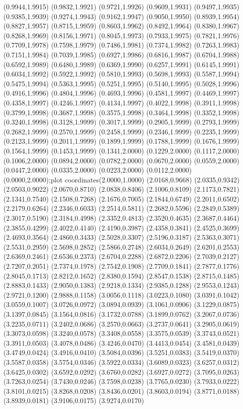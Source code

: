 {(0.9944,1.9915) (0.9832,1.9921) (0.9721,1.9926) (0.9609,1.9931) (0.9497,1.9935) (0.9385,1.9939) (0.9274,1.9943) (0.9162,1.9947) (0.9050,1.9950) (0.8939,1.9954) (0.8827,1.9957) (0.8715,1.9959) (0.8603,1.9962) (0.8492,1.9964) (0.8380,1.9967) (0.8268,1.9969) (0.8156,1.9971) (0.8045,1.9973) (0.7933,1.9975) (0.7821,1.9976) (0.7709,1.9978) (0.7598,1.9979) (0.7486,1.9981) (0.7374,1.9982) (0.7263,1.9983) (0.7151,1.9984) (0.7039,1.9985) (0.6927,1.9986) (0.6816,1.9987) (0.6704,1.9988) (0.6592,1.9989) (0.6480,1.9989) (0.6369,1.9990) (0.6257,1.9991) (0.6145,1.9991) (0.6034,1.9992) (0.5922,1.9992) (0.5810,1.9993) (0.5698,1.9993) (0.5587,1.9994) (0.5475,1.9994) (0.5363,1.9995) (0.5251,1.9995) (0.5140,1.9995) (0.5028,1.9996) (0.4916,1.9996) (0.4804,1.9996) (0.4693,1.9996) (0.4581,1.9997) (0.4469,1.9997) (0.4358,1.9997) (0.4246,1.9997) (0.4134,1.9997) (0.4022,1.9998) (0.3911,1.9998) (0.3799,1.9998) (0.3687,1.9998) (0.3575,1.9998) (0.3464,1.9998) (0.3352,1.9998) (0.3240,1.9998) (0.3128,1.9999) (0.3017,1.9999) (0.2905,1.9999) (0.2793,1.9999) (0.2682,1.9999) (0.2570,1.9999) (0.2458,1.9999) (0.2346,1.9999) (0.2235,1.9999) (0.2123,1.9999) (0.2011,1.9999) (0.1899,1.9999) (0.1788,1.9999) (0.1676,1.9999) (0.1564,1.9999) (0.1453,1.9999) (0.1341,2.0000) (0.1229,2.0000) (0.1117,2.0000) (0.1006,2.0000) (0.0894,2.0000) (0.0782,2.0000) (0.0670,2.0000) (0.0559,2.0000) (0.0447,2.0000) (0.0335,2.0000) (0.0223,2.0000) (0.0112,2.0000) (0.0000,2.0000)};plot coordinates{(2.0000,1.0000) (2.0168,0.9668) (2.0335,0.9342) (2.0503,0.9022) (2.0670,0.8710) (2.0838,0.8406) (2.1006,0.8109) (2.1173,0.7821) (2.1341,0.7540) (2.1508,0.7268) (2.1676,0.7005) (2.1844,0.6749) (2.2011,0.6502) (2.2179,0.6264) (2.2346,0.6033) (2.2514,0.5811) (2.2682,0.5596) (2.2849,0.5389) (2.3017,0.5190) (2.3184,0.4998) (2.3352,0.4813) (2.3520,0.4635) (2.3687,0.4464) (2.3855,0.4299) (2.4022,0.4140) (2.4190,0.3987) (2.4358,0.3841) (2.4525,0.3699) (2.4693,0.3564) (2.4860,0.3433) (2.5028,0.3307) (2.5196,0.3187) (2.5363,0.3071) (2.5531,0.2959) (2.5698,0.2852) (2.5866,0.2748) (2.6034,0.2649) (2.6201,0.2553) (2.6369,0.2461) (2.6536,0.2373) (2.6704,0.2288) (2.6872,0.2206) (2.7039,0.2127) (2.7207,0.2051) (2.7374,0.1978) (2.7542,0.1908) (2.7709,0.1841) (2.7877,0.1776) (2.8045,0.1713) (2.8212,0.1652) (2.8380,0.1594) (2.8547,0.1538) (2.8715,0.1485) (2.8883,0.1433) (2.9050,0.1383) (2.9218,0.1334) (2.9385,0.1288) (2.9553,0.1243) (2.9721,0.1200) (2.9888,0.1158) (3.0056,0.1118) (3.0223,0.1080) (3.0391,0.1042) (3.0559,0.1007) (3.0726,0.0972) (3.0894,0.0939) (3.1061,0.0906) (3.1229,0.0875) (3.1397,0.0845) (3.1564,0.0816) (3.1732,0.0788) (3.1899,0.0762) (3.2067,0.0736) (3.2235,0.0711) (3.2402,0.0686) (3.2570,0.0663) (3.2737,0.0641) (3.2905,0.0619) (3.3073,0.0598) (3.3240,0.0578) (3.3408,0.0558) (3.3575,0.0539) (3.3743,0.0521) (3.3911,0.0503) (3.4078,0.0486) (3.4246,0.0470) (3.4413,0.0454) (3.4581,0.0439) (3.4749,0.0424) (3.4916,0.0410) (3.5084,0.0396) (3.5251,0.0383) (3.5419,0.0370) (3.5587,0.0358) (3.5754,0.0346) (3.5922,0.0334) (3.6089,0.0323) (3.6257,0.0312) (3.6425,0.0302) (3.6592,0.0292) (3.6760,0.0282) (3.6927,0.0272) (3.7095,0.0263) (3.7263,0.0254) (3.7430,0.0246) (3.7598,0.0238) (3.7765,0.0230) (3.7933,0.0222) (3.8101,0.0215) (3.8268,0.0208) (3.8436,0.0201) (3.8603,0.0194) (3.8771,0.0188) (3.8939,0.0181) (3.9106,0.0175) (3.9274,0.0170) }
